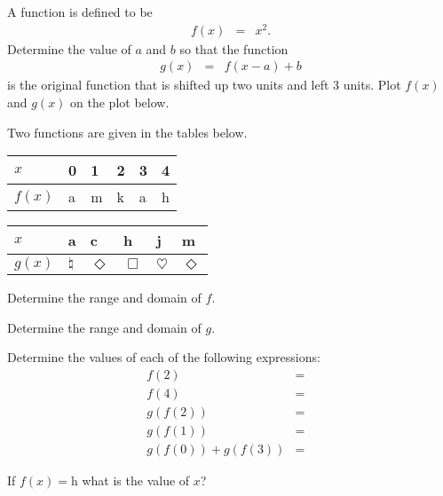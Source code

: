\begin{problem}
\item A function is defined to be
  \begin{eqnarray*}
    f(x) & = & x^2.
  \end{eqnarray*}
  Determine the value of $a$ and $b$ so that the function
  \begin{eqnarray*}
    g(x) & = & f(x-a)+b
  \end{eqnarray*}
  is the original function that is shifted up two units and left 3
  units. Plot $f(x)$ and $g(x)$ on the plot below.

  \scalebox{0.95}{}

  \clearpage

\item Two functions are given in the tables below.

  \begin{tabular}[h]{l||l|l|l|l|l}
    $x$    & 0 & 1 & 2 & 3 & 4 \\ \hline
    $f(x)$ & a & m & k & a & h \\
  \end{tabular}

  \begin{tabular}[h]{l||l|l|l|l|l}
    $x$    & a & c & h & j & m \\ \hline
    $g(x)$ & $\natural$ & $\Diamond$ & $\Box$ & $\heartsuit$ & $\Diamond$ \\
  \end{tabular}

  \begin{subproblem}
  \item Determine the range and domain of $f$.
    \vspace{2em}
  \item Determine the range and domain of $g$.
    \vspace{2em}
  \item Determine the values of each of the following expressions:
    \begin{eqnarray*}
      f(2) & = & \\
      f(4) & = & \\
      g(f(2)) & = & \\
      g(f(1)) & = & \\
      g(f(0))+g(f(3)) & = &
    \end{eqnarray*}
  \item If $f(x)=$h what is the value of $x$?
  \end{subproblem}


\end{problem}
